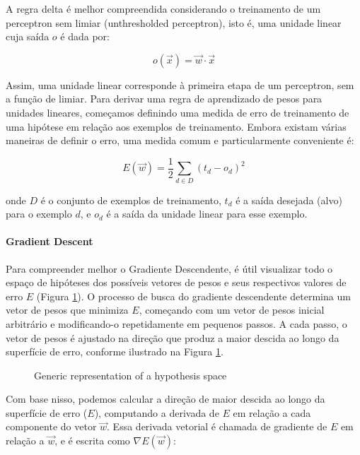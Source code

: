 \documentclass{tufte-handout}
\begin{document}
A regra delta é melhor compreendida considerando o treinamento de um perceptron sem limiar (unthresholded perceptron), isto é, uma unidade linear cuja saída $o$ é dada por:

\begin{equation}
o(\Vec{x}) = \Vec{w} \cdot \Vec{x}
\end{equation}

Assim, uma unidade linear corresponde à primeira etapa de um perceptron, sem a função de limiar.
Para derivar uma regra de aprendizado de pesos para unidades lineares, começamos definindo uma medida de erro de treinamento de uma hipótese em relação aos exemplos de treinamento. Embora existam várias maneiras de definir o erro, uma medida comum e particularmente conveniente é:

\begin{equation} \label{eq:7}
E(\Vec{w}) = \frac{1}{2}\sum_{d\in D} (t_d - o_d)^2
\end{equation}

onde $D$ é o conjunto de exemplos de treinamento, $t_d$ é a saída desejada (alvo) para o exemplo $d$, e $o_d$ é a saída da unidade linear para esse exemplo.

\paragraph{Gradient Descent}

Para compreender melhor o Gradiente Descendente, é útil visualizar todo o espaço de hipóteses dos possíveis vetores de pesos e seus respectivos valores de erro $E$ (Figura \ref{fig:GD}).
O processo de busca do gradiente descendente determina um vetor de pesos que minimiza $E$, começando com um vetor de pesos inicial arbitrário e modificando-o repetidamente em pequenos passos.
A cada passo, o vetor de pesos é ajustado na direção que produz a maior descida ao longo da superfície de erro, conforme ilustrado na Figura \ref{fig:GD}.

\begin{figure}
\centering
{}
\caption{Generic representation of a hypothesis space}
\label{fig:GD}
\end{figure}
Com base nisso, podemos calcular a direção de maior descida ao longo da superfície de erro ($E$), computando a derivada de $E$ em relação a cada componente do vetor $\Vec{w}$.
Essa derivada vetorial é chamada de gradiente de $E$ em relação a $\Vec{w}$, e é escrita como $\nabla E(\Vec{w})$:
\end{document}
